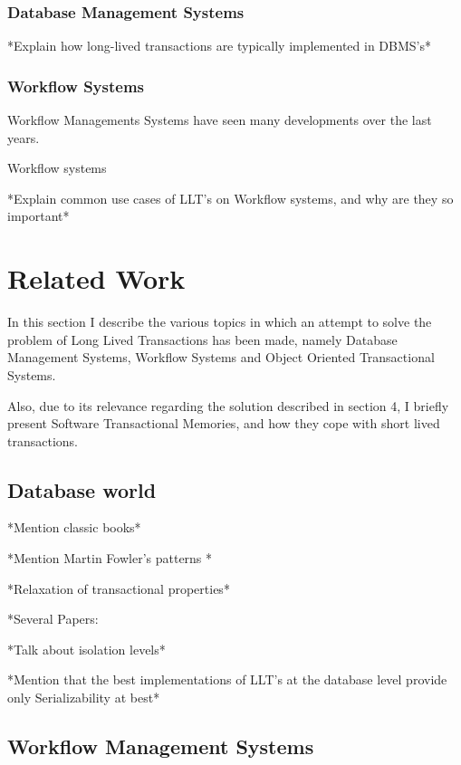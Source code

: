 \documentclass{llncs}
\begin{document}
\subsubsection{Database Management Systems}

*Explain how long-lived transactions are typically implemented in DBMS's*

\subsubsection{Workflow Systems}

Workflow Managements Systems have seen many developments over the last
years.

Workflow systems 

*Explain common use cases of LLT's on Workflow systems, and why are
they so important*


\section{Related Work}

In this section I describe the various topics in which an attempt to
solve the problem of Long Lived Transactions has been made, namely
Database Management Systems, Workflow Systems and Object Oriented
Transactional Systems.

Also, due to its relevance regarding the
solution described in section 4, I briefly present Software
Transactional Memories, and how they cope with short lived transactions.

\subsection{Database world}

*Mention classic books*

*Mention Martin Fowler's patterns \cite{fowler2003patterns}*

*Relaxation of transactional properties*

*Several Papers: \cite{hagmann1991implementing} \cite{garcia1987sagas}
\cite{salem1989altruistic}

*Talk about isolation levels*

*Mention that the best implementations of LLT's at the database level
provide only Serializability at best*

\subsection{Workflow Management Systems}
\end{document}

